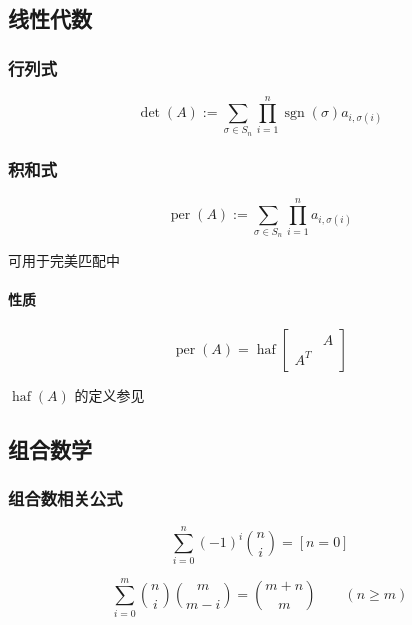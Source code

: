 \subsection{线性代数}

\subsubsection{行列式}

\begin{equation}
    \operatorname{det}(A):=\sum_{\sigma\in S_n}\prod_{i=1}^n \operatorname{sgn}(\sigma) a_{i,\sigma(i)}
\end{equation}

\subsubsection{积和式}

\begin{equation}
    \operatorname{per}(A):=\sum_{\sigma\in S_n}\prod_{i=1}^n a_{i,\sigma(i)}
\end{equation}

可用于完美匹配中

\paragraph{性质}

\begin{equation}
    \operatorname{per}(A)=\operatorname{haf}\begin{bmatrix}
            & A \\
        A^T & 
    \end{bmatrix}
\end{equation}

\(\operatorname{haf}(A)\) 的定义参见 

\subsection{组合数学}

\subsubsection{组合数相关公式}

\begin{equation}
    \sum_{i=0}^n(-1)^i\binom{n}{i}=[n=0]
\end{equation}

\begin{equation}
    \sum_{i=0}^m \binom{n}{i}\binom{m}{m-i} = \binom{m+n}{m}\qquad(n \geq m)
\end{equation}


